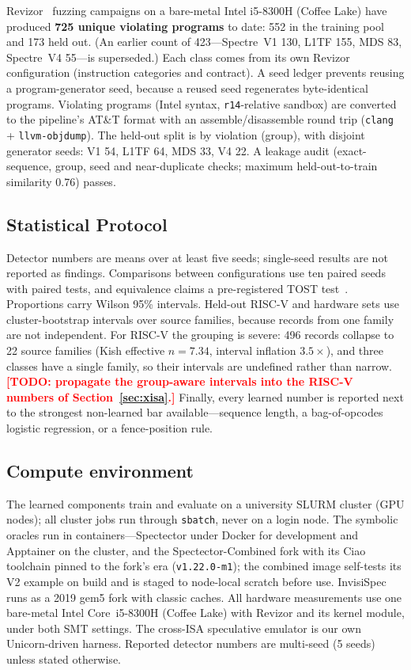 \documentclass[conference]{IEEEtran}
\newcommand{\todo}[1]{\textcolor{red}{\textbf{[TODO: #1]}}}
\begin{document}
Revizor~\cite{revizor} fuzzing campaigns on a bare-metal Intel i5-8300H (Coffee
Lake) have produced \textbf{725 unique violating programs} to date: 552 in the
training pool and 173 held out. (An earlier count of 423---Spectre~V1 130,
L1TF 155, MDS 83, Spectre~V4 55---is superseded.)
Each class comes from its own Revizor configuration
(instruction categories and contract). A seed ledger prevents reusing a
program-generator seed, because a reused seed regenerates byte-identical
programs. Violating programs (Intel syntax, \texttt{r14}-relative sandbox) are
converted to the pipeline's AT\&T format with an assemble/disassemble round trip
(\texttt{clang} + \texttt{llvm-objdump}). The held-out split is by violation
(group), with disjoint generator seeds: V1 54, L1TF 64, MDS 33, V4 22. A
leakage audit (exact-sequence, group, seed and near-duplicate checks; maximum
held-out-to-train similarity 0.76) passes.

\subsection{Statistical Protocol}
\label{sec:stats}
Detector numbers are means over at least five seeds; single-seed results are
not reported as findings. Comparisons between configurations use ten paired
seeds with paired tests, and equivalence claims a pre-registered TOST
test~\cite{schuirmann1987}. Proportions carry Wilson 95\% intervals. Held-out
RISC-V and hardware sets use cluster-bootstrap intervals over source families,
because records from one family are not independent. For RISC-V the grouping is
severe: 496 records collapse to 22 source families (Kish effective $n=7.34$,
interval inflation $3.5\times$), and three classes have a single family, so
their intervals are undefined rather than narrow.
\todo{propagate the group-aware intervals into the RISC-V numbers of
Section~\ref{sec:xisa}.} Finally, every learned number is reported next to the
strongest non-learned bar available---sequence length, a bag-of-opcodes
logistic regression, or a fence-position rule.

\subsection{Compute environment}
\label{sec:compute}
The learned components train and evaluate on a university SLURM cluster
(GPU nodes); all cluster jobs run through \texttt{sbatch}, never on a login
node. The symbolic oracles run in containers---Spectector under Docker for
development and Apptainer on the cluster, and the Spectector-Combined fork with
its Ciao toolchain pinned to the fork's era (\texttt{v1.22.0-m1}); the combined
image self-tests its V2 example on build and is staged to node-local scratch
before use. InvisiSpec runs as a 2019 gem5 fork with classic caches. All
hardware measurements use one bare-metal Intel Core~i5-8300H (Coffee Lake) with
Revizor and its kernel module, under both SMT settings. The cross-ISA
speculative emulator is our own Unicorn-driven harness. Reported detector
numbers are multi-seed (5 seeds) unless stated otherwise.
\end{document}
